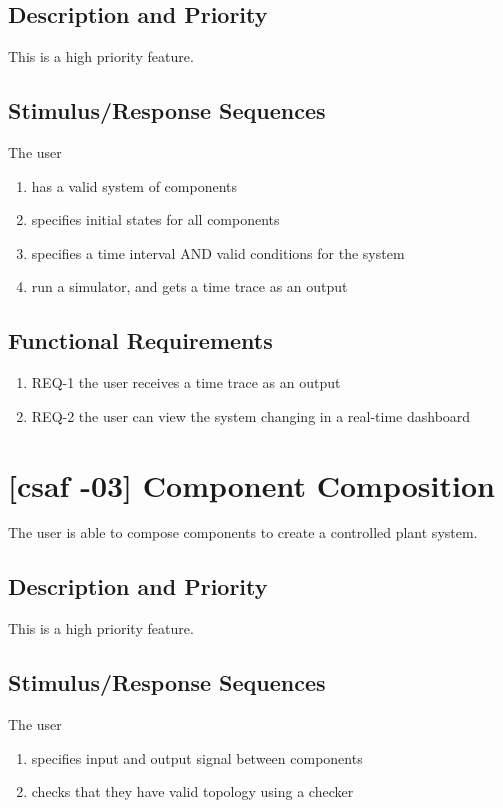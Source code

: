 \subsection{Description and Priority}
This is a high priority feature.

\subsection{Stimulus/Response Sequences}
The user
\begin{enumerate}
\item has a valid system of components
\item specifies initial states for all components
\item specifies a time interval AND valid conditions for the system
\item run a simulator, and gets a time trace as an output
\end{enumerate}

\subsection{Functional Requirements}
\begin{enumerate}
\item REQ-1 \quad the user receives a time trace as an output
\item REQ-2 \quad the user can view the system changing in a real-time dashboard
\end{enumerate}


\section{[\acrshort{csaf} -03] Component Composition}
The user is able to compose components to create a controlled plant system.

\subsection{Description and Priority}
This is a high priority feature.

\subsection{Stimulus/Response Sequences}
The user
\begin{enumerate}
\item specifies input and output signal between components
\item checks that they have valid topology using a checker
\end{enumerate}

